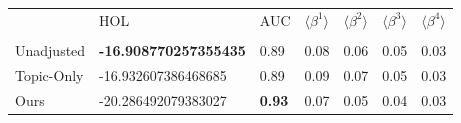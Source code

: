 \begin{tabular}{lllllll}
\toprule
{} &                           HOL &            AUC & $\langle\beta^1\rangle$ & $\langle\beta^2\rangle$ & $\langle\beta^3\rangle$ & $\langle\beta^4\rangle$ \\
           &                               &                &                         &                         &                         &                         \\
\midrule
Unadjusted &  \textbf{-16.908770257355435} &           0.89 &                    0.08 &                    0.06 &                    0.05 &                    0.03 \\
Topic-Only &           -16.932607386468685 &           0.89 &                    0.09 &                    0.07 &                    0.05 &                    0.03 \\
Ours       &           -20.286492079383027 &  \textbf{0.93} &                    0.07 &                    0.05 &                    0.04 &                    0.03 \\
\bottomrule
\end{tabular}
